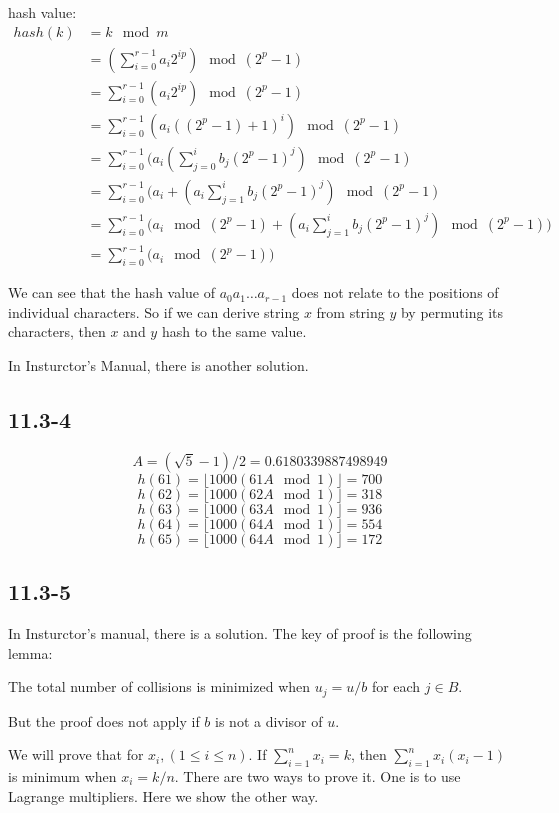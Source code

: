 \documentclass{book}
\begin{document}
\begin{CJK}{UTF8}{gkai}
hash value:
\begin{align*}
hash(k) & = k \mod m \\
& = (\sum_{i=0}^{r-1}a_i 2^{ip}) \mod (2^p-1) \\
& = \sum_{i=0}^{r-1}(a_i 2^{ip}) \mod (2^p-1) \\
& = \sum_{i=0}^{r-1}(a_i ((2^{p}-1)+1)^i) \mod (2^p-1) \\
& = \sum_{i=0}^{r-1}(a_i (\sum_{j=0}^{i}b_j(2^p-1)^j) \mod (2^p-1) \\
& = \sum_{i=0}^{r-1}(a_i + (a_i\sum_{j=1}^{i}b_j(2^p-1)^j) \mod (2^p-1) \\
& = \sum_{i=0}^{r-1}\Big(a_i\mod (2^p-1) + (a_i\sum_{j=1}^{i}b_j(2^p-1)^j) \mod 
(2^p-1) \Big)\\
& = \sum_{i=0}^{r-1}\Big(a_i\mod (2^p-1)\Big)
\end{align*}

We can see that the hash value of $a_0 a_1 \dots a_{r-1}$ does not relate to the 
positions of individual characters. So if we can derive string $x$ from string 
$y$ by permuting its characters, then $x$ and $y$ hash to
the same value.

In Insturctor's Manual, there is another solution.

\subsection*{11.3-4}
$$A=(\sqrt{5}-1)/2=0.6180339887498949$$
$$h(61) = \lfloor 1000 (61A \mod 1)\rfloor = 700$$
$$h(62) = \lfloor 1000 (62A \mod 1)\rfloor = 318$$
$$h(63) = \lfloor 1000 (63A \mod 1)\rfloor = 936$$
$$h(64) = \lfloor 1000 (64A \mod 1)\rfloor = 554$$
$$h(65) = \lfloor 1000 (64A \mod 1)\rfloor = 172$$

\subsection*{11.3-5}
In Insturctor's manual, there is a solution. The key of proof is the following 
lemma:

The total number of collisions is minimized when $u_j = u/b$ for each $j \in B$.

But the proof does not apply if $b$ is not a divisor of $u$. 


We will prove that for $x_i, (1 \le i \le n)$. If $\sum_{i=1}^{n}x_i=k$, then 
$\sum_{i=1}^{n}x_i(x_i-1)$ is minimum when $x_i=k/n$. There are two ways to 
prove it. One is to use Lagrange multipliers. Here we show the other way. 


\end{CJK}
\end{document}
